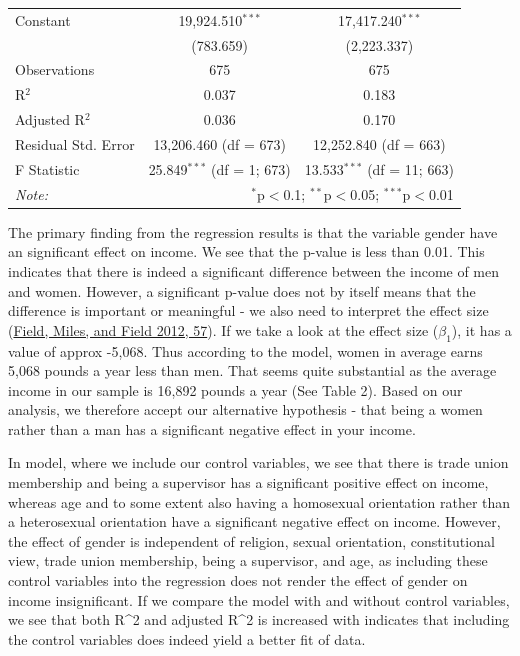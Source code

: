 \documentclass[
]{article}
\begin{document}
\begin{table}[H]
\begin{tabular}{@{\hspace{5pt}}l@{\hspace{5pt}}cc}
 \addlinespace 
 Constant & 19,924.510$^{***}$ & 17,417.240$^{***}$ \\ 
  & (783.659) & (2,223.337) \\ 
 \addlinespace 
\midrule  
Observations & 675 & 675 \\ 
R$^{2}$ & 0.037 & 0.183 \\ 
Adjusted R$^{2}$ & 0.036 & 0.170 \\ 
Residual Std. Error & 13,206.460 (df = 673) & 12,252.840 (df = 663) \\ 
F Statistic & 25.849$^{***}$ (df = 1; 673) & 13.533$^{***}$ (df = 11; 663) \\ 
\bottomrule 
\textit{Note:}  & \multicolumn{2}{r}{$^{*}$p$<$0.1; $^{**}$p$<$0.05; $^{***}$p$<$0.01} \\ 
\end{tabular} 
\end{table}

The primary finding from the regression results is that the variable
gender have an significant effect on income. We see that the p-value is
less than 0.01. This indicates that there is indeed a significant
difference between the income of men and women. However, a significant
p-value does not by itself means that the difference is important or
meaningful - we also need to interpret the effect size
(\protect\hyperlink{ref-field2012discovering}{Field, Miles, and Field
2012, 57}). If we take a look at the effect size (\(\beta_1\)), it has a
value of approx -5,068. Thus according to the model, women in average
earns 5,068 pounds a year less than men. That seems quite substantial as
the average income in our sample is 16,892 pounds a year (See Table 2).
Based on our analysis, we therefore accept our alternative hypothesis -
that being a women rather than a man has a significant negative effect
in your income.

In model, where we include our control variables, we see that there is
trade union membership and being a supervisor has a significant positive
effect on income, whereas age and to some extent also having a
homosexual orientation rather than a heterosexual orientation have a
significant negative effect on income. However, the effect of gender is
independent of religion, sexual orientation, constitutional view, trade
union membership, being a supervisor, and age, as including these
control variables into the regression does not render the effect of
gender on income insignificant. If we compare the model with and without
control variables, we see that both R\^{}2 and adjusted R\^{}2 is
increased with indicates that including the control variables does
indeed yield a better fit of data.
\end{document}
